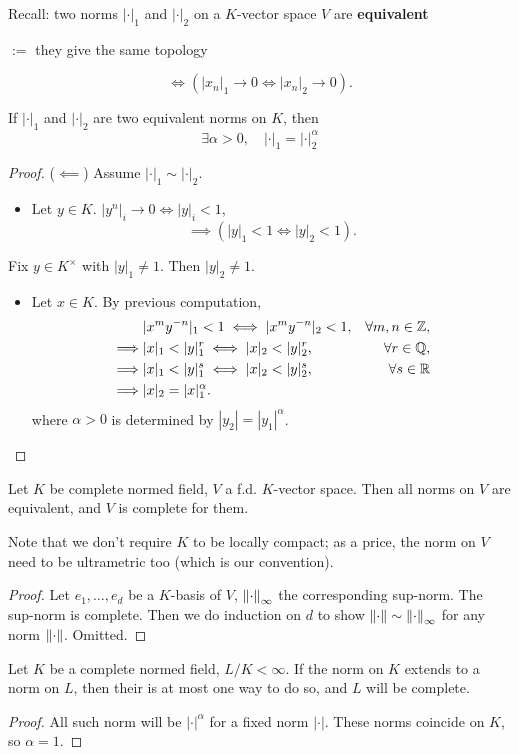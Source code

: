 Recall: two norms $|\cdot|_1$ and $|\cdot|_2$
on a $K$-vector space $V$ are \textbf{equivalent} \begin{center}
    $:=$ they give the same topology
\end{center}\[\iff (|x_n|_1\to 0\iff |x_n|_2\to 0).\]
\begin{proposition}
    If $|\cdot|_1$ and $|\cdot|_2$ are two equivalent norms on $K$, then \[\exists\alpha > 0,\quad |\cdot|_1 = |\cdot|_2^\alpha\]
\end{proposition}
\begin{proof}
    ($\impliedby$) Assume $|\cdot|_1\sim|\cdot|_2$.
    \begin{itemize}
\item Let $y\in K$. $|y^n|_i\to 0\iff |y|_i < 1$,
\[\implies \left( |y|_1 < 1\iff |y|_2 < 1 \right).\]
    \end{itemize}
Fix $y\in K^\times$ with $|y|_1\ne 1$. Then $|y|_2\ne 1$.
\begin{itemize}
    \item Let $x\in K$.
    By previous computation, 
    \begin{align*}
        &{} |x^my^{-n}|_1 < 1\iff |x^my^{-n}|_2 < 1, &\forall m, n\in\mathbb{Z},\\
    \implies &{} |x|_1 < |y|_1^{r}\iff |x|_2 < |y|_2^{r}, &\forall r\in\mathbb{Q},\\
    \implies &{} |x|_1 < |y|_1^{s}\iff |x|_2 < |y|_2^{s}, &\forall s\in\mathbb{R}\\
    \implies &{} |x|_2 = |x|_1^{\alpha}. &
    \end{align*}
    where $\alpha > 0$ is determined by $|y_2| = |y_1|^\alpha$.\qedhere
\end{itemize}
\end{proof}
\begin{theorem}[Artin]
    Let $K$ be complete normed field, $V$ a f.d. $K$-vector space.
    Then all norms on $V$ are equivalent, and $V$ is complete for them.
\end{theorem}
Note that we don't require $K$ to be locally compact; as a price, the norm on $V$ need to be ultrametric too (which is our convention).
\begin{proof}
    Let $e_1, \dots, e_d$ be a $K$-basis of $V$, $\left\| \cdot\right\|_{\infty}$ the corresponding sup-norm. The sup-norm is complete.
    Then we do induction on $d$ to show $\left\| \cdot\right\|\sim \left\| \cdot\right\|_{\infty}$ for any norm $\left\| \cdot\right\|$. Omitted.
\end{proof}

\begin{corollary}
    Let $K$ be a complete normed field, $L/K < \infty$. If the norm on $K$ extends to a norm on $L$, then their is at most one way to do so, and $L$ will be complete.
\end{corollary}
\begin{proof}
    All such norm will be $|\cdot|^\alpha$ for a fixed norm $|\cdot|$.
    These norms coincide on $K$, so $\alpha = 1$.
\end{proof}

